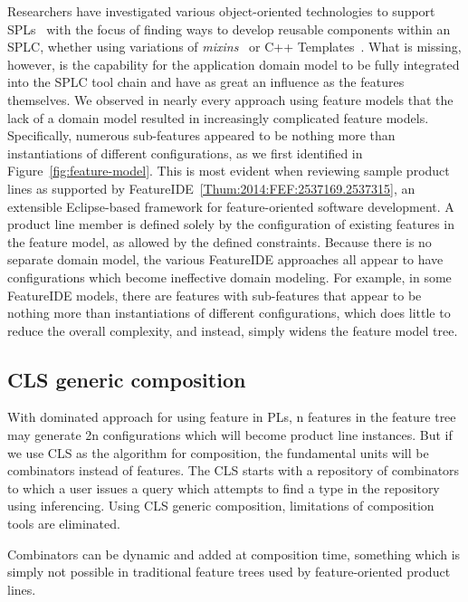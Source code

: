 Researchers have investigated various object-oriented technologies to
support SPLs~\cite{Griss1999,Batory2000} with the focus of finding ways
to develop reusable components within an SPLC, whether using variations
of \textit{mixins}~\cite{Bracha:1990:MI:97946.97982} or C++
Templates~\cite{VanHilst:1996:UCT:646898.710025}. What is missing,
however, is the capability for the application domain model to be fully
integrated into the SPLC tool chain and have as great an influence as
the features themselves. We observed in nearly every approach using
feature models that the lack of a domain model resulted in increasingly
complicated feature models. Specifically, numerous sub-features appeared
to be nothing more than instantiations of different configurations, as
we first identified in Figure~\ref{fig:feature-model}. This is most
evident when reviewing sample product lines as supported by
FeatureIDE~\ref{Thum:2014:FEF:2537169.2537315}, an extensible
Eclipse-based framework for feature-oriented software development. A
product line member is defined solely by the configuration of existing
features in the feature model, as allowed by the defined constraints.
Because there is no separate domain model, the various FeatureIDE
approaches all appear to have configurations which become ineffective
domain modeling. For example, in some FeatureIDE models, there are
features with sub-features that appear to be nothing more than
instantiations of different configurations, which does little to reduce
the overall complexity, and instead, simply widens the feature model tree.

\subsection{CLS generic composition}

With dominated approach for using feature in PLs, n features in the
feature tree may generate 2n configurations which will become product
line instances. But if we use CLS as the algorithm for composition, the
fundamental units will be combinators instead of features. The CLS
starts with a repository of combinators to which a user issues a query
which attempts to find a type in the repository using inferencing. Using
CLS generic composition, limitations of composition tools are
eliminated.


Combinators can be dynamic and added at composition time, something
which is simply not possible in traditional feature trees used by
feature-oriented product lines.

